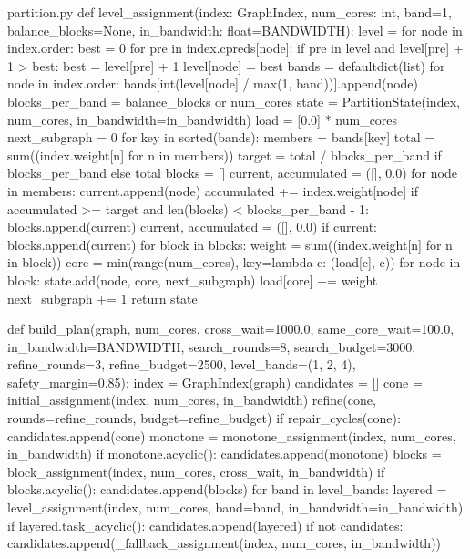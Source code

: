 \begin{Python}{partition.py}
def level_assignment(index: GraphIndex, num_cores: int, band=1, balance_blocks=None, in_bandwidth: float=BANDWIDTH):
    level = {}
    for node in index.order:
        best = 0
        for pre in index.cpreds[node]:
            if pre in level and level[pre] + 1 > best:
                best = level[pre] + 1
        level[node] = best
    bands = defaultdict(list)
    for node in index.order:
        bands[int(level[node] / max(1, band))].append(node)
    blocks_per_band = balance_blocks or num_cores
    state = PartitionState(index, num_cores, in_bandwidth=in_bandwidth)
    load = [0.0] * num_cores
    next_subgraph = 0
    for key in sorted(bands):
        members = bands[key]
        total = sum((index.weight[n] for n in members))
        target = total / blocks_per_band if blocks_per_band else total
        blocks = []
        current, accumulated = ([], 0.0)
        for node in members:
            current.append(node)
            accumulated += index.weight[node]
            if accumulated >= target and len(blocks) < blocks_per_band - 1:
                blocks.append(current)
                current, accumulated = ([], 0.0)
        if current:
            blocks.append(current)
        for block in blocks:
            weight = sum((index.weight[n] for n in block))
            core = min(range(num_cores), key=lambda c: (load[c], c))
            for node in block:
                state.add(node, core, next_subgraph)
            load[core] += weight
            next_subgraph += 1
    return state

def build_plan(graph, num_cores, cross_wait=1000.0, same_core_wait=100.0, in_bandwidth=BANDWIDTH, search_rounds=8, search_budget=3000, refine_rounds=3, refine_budget=2500, level_bands=(1, 2, 4), safety_margin=0.85):
    index = GraphIndex(graph)
    candidates = []
    cone = initial_assignment(index, num_cores, in_bandwidth)
    refine(cone, rounds=refine_rounds, budget=refine_budget)
    if repair_cycles(cone):
        candidates.append(cone)
    monotone = monotone_assignment(index, num_cores, in_bandwidth)
    if monotone.acyclic():
        candidates.append(monotone)
    blocks = block_assignment(index, num_cores, cross_wait, in_bandwidth)
    if blocks.acyclic():
        candidates.append(blocks)
    for band in level_bands:
        layered = level_assignment(index, num_cores, band=band, in_bandwidth=in_bandwidth)
        if layered.task_acyclic():
            candidates.append(layered)
    if not candidates:
        candidates.append(_fallback_assignment(index, num_cores, in_bandwidth))


\end{Python}
